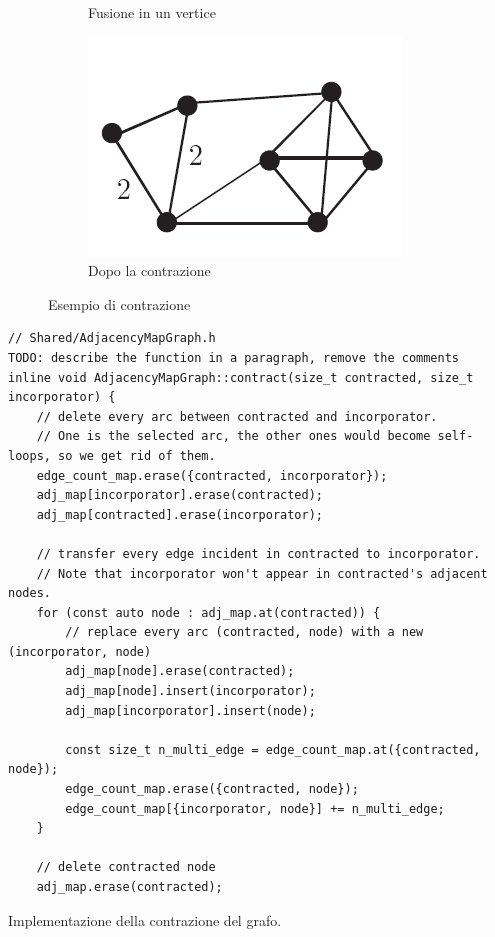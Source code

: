 \begin{figure}[h]
\begin{subfigure}[b]{0.3\textwidth}
             \caption{Fusione in un vertice}
             \label{fig:contract-xy}
     \end{subfigure}
    \hfill
     \begin{subfigure}[b]{0.3\textwidth}
             \centering
             \includegraphics[width=\textwidth]{./images/after-contraction.png}
             \caption{Dopo la contrazione}
             \label{fig:after-contraction}
     \end{subfigure}
     \caption{Esempio di contrazione}
     \label{fig:contraction-example}
\end{figure}

\begin{listing}[!ht]
\begin{verbatim}
// Shared/AdjacencyMapGraph.h
TODO: describe the function in a paragraph, remove the comments
inline void AdjacencyMapGraph::contract(size_t contracted, size_t incorporator) {
    // delete every arc between contracted and incorporator.
    // One is the selected arc, the other ones would become self-loops, so we get rid of them.
    edge_count_map.erase({contracted, incorporator});
    adj_map[incorporator].erase(contracted);
    adj_map[contracted].erase(incorporator);

    // transfer every edge incident in contracted to incorporator.
    // Note that incorporator won't appear in contracted's adjacent nodes.
    for (const auto node : adj_map.at(contracted)) {
        // replace every arc (contracted, node) with a new (incorporator, node)
        adj_map[node].erase(contracted);
        adj_map[node].insert(incorporator);
        adj_map[incorporator].insert(node);

        const size_t n_multi_edge = edge_count_map.at({contracted, node});
        edge_count_map.erase({contracted, node});
        edge_count_map[{incorporator, node}] += n_multi_edge;
    }

    // delete contracted node
    adj_map.erase(contracted);
\end{verbatim}
\caption{Implementazione della contrazione del grafo.}
\label{listing:adjacency-map-graph-contract}
\end{listing}


